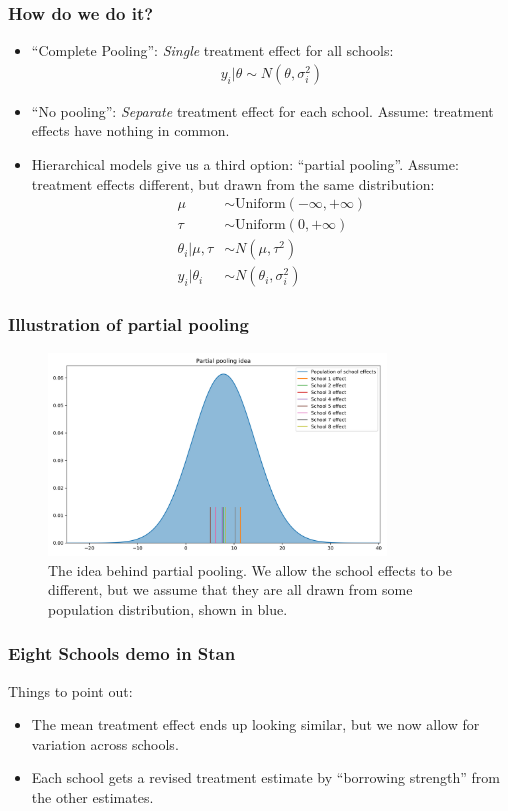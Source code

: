 \documentclass{beamer}
\begin{document}
\begin{frame}
	\frametitle{How do we do it?}
	\begin{itemize}
		\item ``Complete Pooling'': \emph{Single} treatment effect for all schools:
		\begin{align*}
			y_i | \theta \sim N(\theta, \sigma_i^2)	
		\end{align*}
		\item ``No pooling'': \emph{Separate} treatment effect for each school. Assume: treatment effects have nothing in common.
		\item Hierarchical models give us a third option: ``partial pooling''. Assume: treatment effects different, but drawn from the same distribution:
		\begin{align*}
			\mu & \sim \textrm{Uniform}(-\infty, +\infty) \\
			\tau & \sim \textrm{Uniform}(0, +\infty) \\
			\theta_i | \mu, \tau & \sim N(\mu, \tau^2) \\
			y_i | \theta_i & \sim N(\theta_i, \sigma_i^2)
		\end{align*}
	\end{itemize}
\end{frame}

\begin{frame}
	\frametitle{Illustration of partial pooling}
	\begin{figure}
		\includegraphics[width=0.8\textwidth]{partial_pooling}
		\caption{The idea behind partial pooling. We allow the school effects to be different, but we assume that they are all drawn from some population distribution, shown in blue.}		
	\end{figure}
\end{frame}

\begin{frame}[fragile]
\frametitle{Eight Schools demo in Stan}
Things to point out:
\begin{itemize}
	\item The mean treatment effect ends up looking similar, but we now allow for variation across schools.
	\item Each school gets a revised treatment estimate by ``borrowing strength'' from the other estimates.
\end{itemize}
\end{frame}
\end{document}
